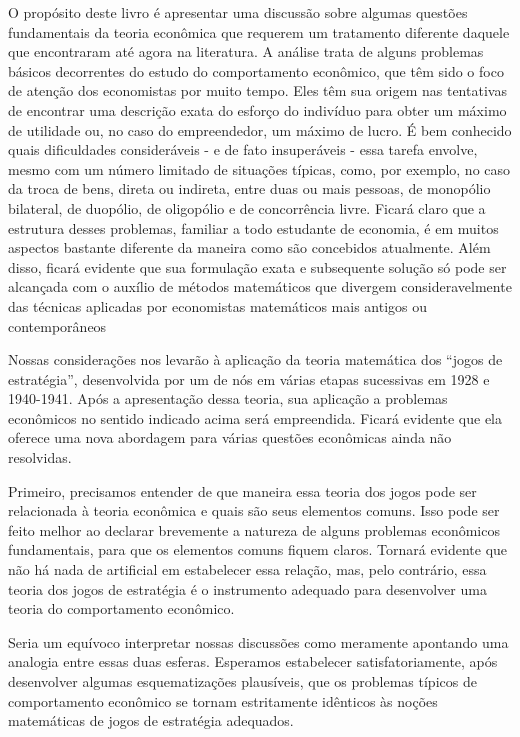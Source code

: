 \documentclass[a4paper,12pt]{article}[abntex2]
\begin{document}
O propósito deste livro é apresentar uma discussão sobre algumas questões fundamentais da teoria econômica que requerem um tratamento diferente daquele que encontraram até agora na literatura. A análise trata de alguns problemas básicos decorrentes do estudo do comportamento econômico, que têm sido o foco de atenção dos economistas por muito tempo. Eles têm sua origem nas tentativas de encontrar uma descrição exata do esforço do indivíduo para obter um máximo de utilidade ou, no caso do empreendedor, um máximo de lucro. É bem conhecido quais dificuldades consideráveis - e de fato insuperáveis - essa tarefa envolve, mesmo com um número limitado de situações típicas, como, por exemplo, no caso da troca de bens, direta ou indireta, entre duas ou mais pessoas, de monopólio bilateral, de duopólio, de oligopólio e de concorrência livre. Ficará claro que a estrutura desses problemas, familiar a todo estudante de economia, é em muitos aspectos bastante diferente da maneira como são concebidos atualmente. Além disso, ficará evidente que sua formulação exata e subsequente solução só pode ser alcançada com o auxílio de métodos matemáticos que divergem consideravelmente das técnicas aplicadas por economistas matemáticos mais antigos ou contemporâneos

Nossas considerações nos levarão à aplicação da teoria matemática dos “jogos de estratégia”, desenvolvida por um de nós em várias etapas sucessivas em 1928 e 1940-1941. Após a apresentação dessa teoria, sua aplicação a problemas econômicos no sentido indicado acima será empreendida. Ficará evidente que ela oferece uma nova abordagem para várias questões econômicas ainda não resolvidas.

Primeiro, precisamos entender de que maneira essa teoria dos jogos pode ser relacionada à teoria econômica e quais são seus elementos comuns. Isso pode ser feito melhor ao declarar brevemente a natureza de alguns problemas econômicos fundamentais, para que os elementos comuns fiquem claros. Tornará evidente que não há nada de artificial em estabelecer essa relação, mas, pelo contrário, essa teoria dos jogos de estratégia é o instrumento adequado para desenvolver uma teoria do comportamento econômico.

Seria um equívoco interpretar nossas discussões como meramente apontando uma analogia entre essas duas esferas. Esperamos estabelecer satisfatoriamente, após desenvolver algumas esquematizações plausíveis, que os problemas típicos de comportamento econômico se tornam estritamente idênticos às noções matemáticas de jogos de estratégia adequados.
\end{document}
